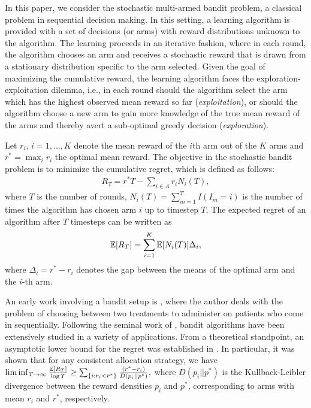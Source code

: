 In this paper, we consider the stochastic multi-armed bandit problem, a classical problem in sequential decision making. In this setting,  a learning algorithm is provided with a set of decisions (or arms) with reward distributions unknown to the algorithm. The learning proceeds in an iterative fashion, where in each round, the algorithm chooses an arm and receives a stochastic reward that is drawn from a stationary distribution specific to the arm selected.  
Given the goal of maximizing the cumulative reward, the learning algorithm faces the exploration-exploitation dilemma, i.e., in each round should the algorithm select the arm which has the highest observed mean reward so far 
(\textit{exploitation}), or should the algorithm choose a new arm to gain more knowledge of the true mean reward of the arms and thereby avert a sub-optimal greedy decision (\textit{exploration}). 

Let $r_i$, $i=1,\ldots,K$ denote the mean reward of the $i$th arm out of the $K$ arms and $r^* = \max_i r_i$ the optimal mean reward. The objective in the stochastic bandit problem is to minimize the cumulative regret, which is defined as follows:
\begin{align*}
R_{T}=r^{*}T - \sum_{i\in A} r_{i}N_{i}(T),
\end{align*}
where $T$ is the number of rounds, $N_{i}(T)=\sum_{m=1}^T I(I_m=i)$ is the number of times the algorithm has chosen arm $i$ up to timestep $T$.
The expected regret of an algorithm after $T$ timesteps can be written as
\begin{align*}
\mathbb{E}[R_{T}]= \sum_{i=1}^K \mathbb{E}[N_i(T)] \Delta_i,
\end{align*}
where $\Delta_{i}=r^{*}-r_{i}$ denotes the gap between the means of the optimal arm and the $i$-th arm. 


                                                                                                                                          


An early work involving a bandit setup is \citet{thompson1933likelihood}, where the author deals with  the problem of choosing between two treatments to administer on patients who come in sequentially. Following the seminal work of \citet{robbins1952some}, bandit algorithms have been extensively studied in a variety of applications. 
From a theoretical standpoint, an asymptotic lower bound for the regret was established in \citet{lai1985asymptotically}. In particular, it was shown that for any consistent allocation strategy, we have
$\liminf_{T \to \infty}\frac{\mathbb{E}[R_{T}]}{\log T}\geq\sum_{\{i:r_{i}<r^{*}\}}\frac{(r^{*}-r_{i})}{D(p_{i}||p^{*})},$
where $D(p_{i}||p^{*})$ is the Kullback-Leibler divergence between the reward densities $p_{i}$ and $p^{*}$, corresponding to arms with mean $r_{i}$ and $r^{*}$, respectively.

